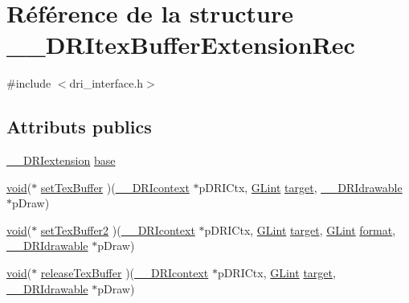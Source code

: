 \hypertarget{struct_____d_r_itex_buffer_extension_rec}{\section{Référence de la structure \-\_\-\-\_\-\-D\-R\-Itex\-Buffer\-Extension\-Rec}
\label{struct_____d_r_itex_buffer_extension_rec}
}


{\ttfamily \#include $<$dri\-\_\-interface.\-h$>$}

\subsection*{Attributs publics}
\begin{DoxyCompactItemize}
\item 
\hyperlink{dri__interface_8h_a4e0a61c8ece00d2b2c6792a9a1b55385}{\-\_\-\-\_\-\-D\-R\-Iextension} \hyperlink{struct_____d_r_itex_buffer_extension_rec_a979ee2a12e9e249c0fb492f7308d19a4}{base}
\item 
\hyperlink{glu_8h_a4292190e3f1f6b373a760c7d9316ad3c}{void}($\ast$ \hyperlink{struct_____d_r_itex_buffer_extension_rec_ae7c9e2b7cc766c7c7a5f5e95e8143d72}{set\-Tex\-Buffer} )(\hyperlink{dri__interface_8h_a3fd295cba82b5a3d79f1ee7e12bfb908}{\-\_\-\-\_\-\-D\-R\-Icontext} $\ast$p\-D\-R\-I\-Ctx, \hyperlink{gl_8h_acebcc1c5663f14ebde1d16831e5fed94}{G\-Lint} \hyperlink{glext_8h_af9d0cbbbeb7414e786c41899e5a856d7}{target}, \hyperlink{dri__interface_8h_a5bfb832a0a08208d95b3bbef439d2262}{\-\_\-\-\_\-\-D\-R\-Idrawable} $\ast$p\-Draw)
\item 
\hyperlink{glu_8h_a4292190e3f1f6b373a760c7d9316ad3c}{void}($\ast$ \hyperlink{struct_____d_r_itex_buffer_extension_rec_abe6cb2446ea81a36b55247d3919cd468}{set\-Tex\-Buffer2} )(\hyperlink{dri__interface_8h_a3fd295cba82b5a3d79f1ee7e12bfb908}{\-\_\-\-\_\-\-D\-R\-Icontext} $\ast$p\-D\-R\-I\-Ctx, \hyperlink{gl_8h_acebcc1c5663f14ebde1d16831e5fed94}{G\-Lint} \hyperlink{glext_8h_af9d0cbbbeb7414e786c41899e5a856d7}{target}, \hyperlink{gl_8h_acebcc1c5663f14ebde1d16831e5fed94}{G\-Lint} \hyperlink{gl_8h_a623c5b7577f9ec4174db688b61b73be7}{format}, \hyperlink{dri__interface_8h_a5bfb832a0a08208d95b3bbef439d2262}{\-\_\-\-\_\-\-D\-R\-Idrawable} $\ast$p\-Draw)
\item 
\hyperlink{glu_8h_a4292190e3f1f6b373a760c7d9316ad3c}{void}($\ast$ \hyperlink{struct_____d_r_itex_buffer_extension_rec_a85e0f071a5f3befdc831bfda50e7abcb}{release\-Tex\-Buffer} )(\hyperlink{dri__interface_8h_a3fd295cba82b5a3d79f1ee7e12bfb908}{\-\_\-\-\_\-\-D\-R\-Icontext} $\ast$p\-D\-R\-I\-Ctx, \hyperlink{gl_8h_acebcc1c5663f14ebde1d16831e5fed94}{G\-Lint} \hyperlink{glext_8h_af9d0cbbbeb7414e786c41899e5a856d7}{target}, \hyperlink{dri__interface_8h_a5bfb832a0a08208d95b3bbef439d2262}{\-\_\-\-\_\-\-D\-R\-Idrawable} $\ast$p\-Draw)
\end{DoxyCompactItemize}


